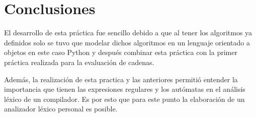 \documentclass[titlepage]{article}
\begin{document}
\section{Conclusiones}
    El desarrollo de esta práctica fue sencillo debido a que al tener los algoritmos ya definidos \cite{compis} solo se tuvo que modelar dichos algoritmos en un lenguaje orientado a objetos en este caso Python y después combinar esta práctica con la primer práctica realizada para la evaluación de cadenas. 
    
    Además, la realización de esta practica y las anteriores permitió entender la importancia que tienen las expresiones regulares y los autómatas en el análisis léxico de un compilador. Es por esto que para este punto la elaboración de un analizador léxico personal es posible.
     
    
\end{document}
